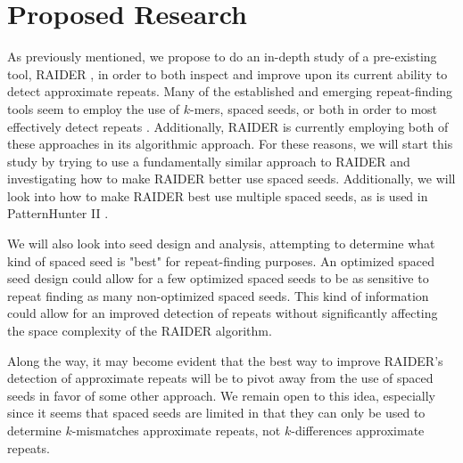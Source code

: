 \chapter{Proposed Research}
\label{proposal}
As previously mentioned, we propose to do an in-depth study of a pre-existing tool, RAIDER \cite{figueroa2013raiderpaper}, in order to both inspect and improve upon its current ability to detect approximate repeats. Many of the established and emerging repeat-finding tools seem to employ the use of $k$-mers, spaced seeds, or both in order to most effectively detect repeats \cite{saha2008computational}. Additionally, RAIDER is currently employing both of these approaches in its algorithmic approach. For these reasons, we will start this study by trying to use a fundamentally similar approach to RAIDER and investigating how to make RAIDER better use spaced seeds. Additionally, we will look into how to make RAIDER best use multiple spaced seeds, as is used in PatternHunter II \cite{li2003patternhunter2}.

We will also look into seed design and analysis, attempting to determine what kind of spaced seed is "best" for repeat-finding purposes. An  optimized spaced seed design could allow for a few optimized spaced seeds to be as sensitive to repeat finding as many non-optimized spaced seeds. This kind of information could allow for an improved detection of repeats without significantly affecting the space complexity of the RAIDER algorithm. 

Along the way, it may become evident that the best way to improve RAIDER's detection of approximate repeats will be to pivot away from the use of spaced seeds in favor of some other approach. We remain open to this idea, especially since it seems that spaced seeds are limited in that they can only be used to determine $k$-mismatches approximate repeats, not $k$-differences approximate repeats.